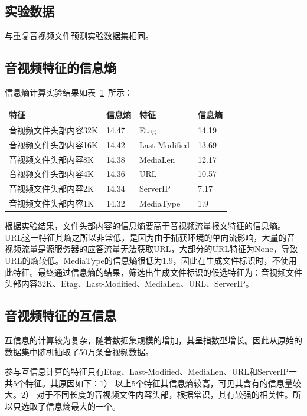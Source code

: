 \subsection{实验数据}
与重复音视频文件预测实验数据集相同。

\subsection{音视频特征的信息熵}
信息熵计算实验结果如表~\ref{tab:CharacteristicInformation}~所示：
\begin{table}[!htbp]
    \label{tab:CharacteristicInformation}
    \centering
    \footnotesize%
    \setlength{\tabcolsep}{4pt}%
    \renewcommand{\arraystretch}{1.2}%
    \begin{tabular}{ll|ll}
        \hline
       特征&信息熵& 特征&信息熵\\
        \hline
        音视频文件头部内容32K&14.47&Etag&14.19\\
        音视频文件头部内容16K&14.42&Last-Modified&13.69\\
        音视频文件头部内容8K&14.38&MediaLen&12.17\\
        音视频文件头部内容4K&14.36&URL&10.57\\
        音视频文件头部内容2K&14.34&ServerIP&7.17\\
        音视频文件头部内容1K&14.32&MediaType&1.9\\
        \hline
    \end{tabular}
\end{table}

根据实验结果，文件头部内容的信息熵要高于音视频流量报文特征的信息熵。URL这一特征其熵之所以非常低，是因为由于捕获环境的单向流影响，大量的音视频流量是源服务器的应答流量无法获取URL，大部分的URL特征为None，导致URL的熵较低。MediaType的信息熵很低为1.9，因此在生成文件标识时，不使用此特征。最终通过信息熵的结果，筛选出生成文件标识的候选特征为：音视频文件头部内容32K、Etag、Last-Modified、MediaLen、URL、ServerIP。

\subsection{音视频特征的互信息}
互信息的计算较为复杂，随着数据集规模的增加，其呈指数型增长。因此从原始的数据集中随机抽取了50万条音视频数据。

参与互信息计算的特征只有Etag、Last-Modified、MediaLen、URL和ServerIP一共5个特征。其原因如下：1）  以上5个特征其信息熵较高，可见其含有的信息量较大。2）  对于不同长度的音视频文件内容头部，根据常识，其有较强的相关性。所以只选取了信息熵最大的一个。

